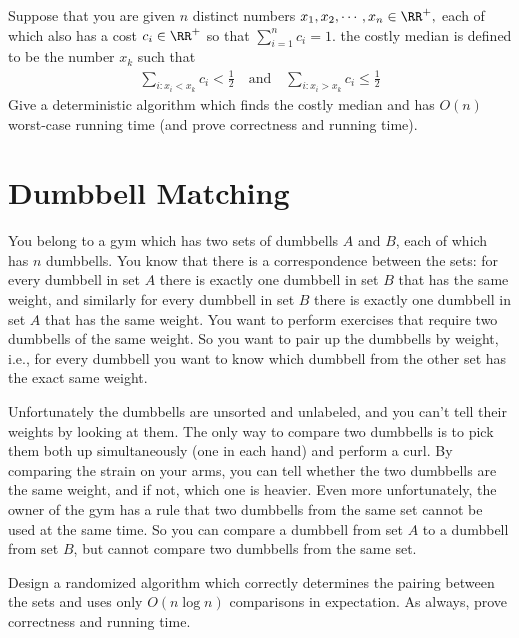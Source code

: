 \documentclass{article}
\begin{document}
Suppose that you are given $n$ distinct numbers $x_1, x_2, \cdots, x_n\in\RR^+,$ each of which also has a cost $c_i\in\RR^+$ so that $\sum_{i=1}^{n} c_i=1.$ the costly median is defined to be the number $x_k$ such that
\begin{align*}
	\sum_{i: x_i<x_k}^{} c_i<\frac{1}{2} \quad\text{and}\quad \sum_{i:x_i>x_k}^{}c_i\le\frac{1}{2}
\end{align*}
Give a deterministic algorithm which finds the costly median and has $O(n)$ worst-case running time (and prove correctness and running time).

\section{Dumbbell Matching}
You belong to a gym which has two sets of dumbbells $A$ and $B$, each of which has $n$ dumbbells.  You know that there is a correspondence between the sets: for every dumbbell in set $A$ there is exactly one dumbbell in set $B$ that has the same weight, and similarly for every dumbbell in set $B$ there is exactly one dumbbell in set $A$ that has the same weight.  You want to perform exercises that require two dumbbells of the same weight.  So you want to pair up the dumbbells by weight, i.e., for every dumbbell you want to know which dumbbell from the other set has the exact same weight.

Unfortunately the dumbbells are unsorted and unlabeled, and you can't tell their weights by looking at them. The only way to compare two dumbbells is to pick them both up simultaneously (one in each hand) and perform a curl.  By comparing the strain on your arms, you can tell whether the two dumbbells are the same weight, and if not, which one is heavier.  Even more unfortunately, the owner of the gym has a rule that two dumbbells from the same set cannot be used at the same time.  So you can compare a dumbbell from set $A$ to a dumbbell from set $B$, but cannot compare two dumbbells from the same set.  

Design a randomized algorithm which correctly determines the pairing between the sets and uses only $O(n \log n)$ comparisons in expectation.  As always, prove correctness and running time.
\end{document}

